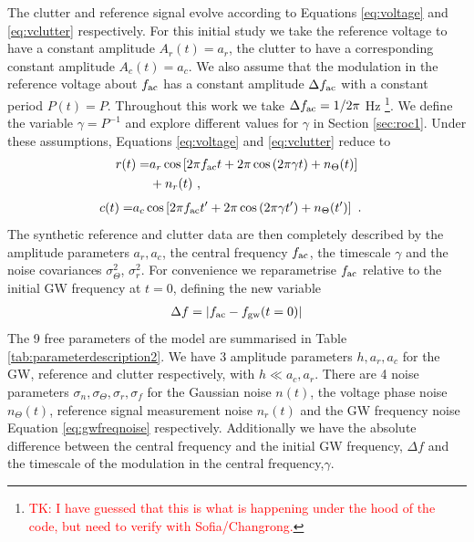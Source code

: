 \documentclass[pra,superscriptaddress,reprint,amsmath,amssymb,nofootinbib]{revtex4-2}
\begin{document}
The clutter and reference signal evolve according to Equations \eqref{eq:voltage} and \eqref{eq:vclutter} respectively. For this initial study we take the reference voltage to have a constant amplitude $A_r(t) = a_r$, the clutter to have a corresponding constant amplitude $A_c(t) = a_c$. We also assume that the modulation in the reference voltage about $f_{\rm ac}$ has a constant amplitude $\Delta f_{\rm ac}$ with a constant period $P(t) = P$. Throughout this work we take $\Delta f_{\rm ac} = 1/2\pi$ Hz \footnote{\tiny \textcolor{red}{TK: I have guessed that this is what is happening under the hood of the code, but need to verify with Sofia/Changrong.}\normalsize}. We define the variable $\gamma = P^{-1}$ and explore different values for $\gamma$ in Section \ref{sec:roc1}. Under these assumptions, Equations \eqref{eq:voltage} and \eqref{eq:vclutter} reduce to 
\begin{align}
	r(t) = &a_r \cos \left[ 2 \pi f_{\rm ac} t + 2 \pi \cos\left(2 \pi \gamma t\right) + n_{\Theta} (t)\right] \\ \nonumber 
	&+n_r(t) \ ,
\end{align}
\begin{eqnarray}
	c(t) = &a_c \cos \left[ 2 \pi f_{\rm ac} t' + 2 \pi \cos\left(2 \pi \gamma t' \right) + n_{\Theta} (t')\right] \ .
\end{eqnarray}
The synthetic reference and clutter data are then completely described by the amplitude parameters $a_r,a_c$, the central frequency $f_{\rm ac}$, the timescale $\gamma$ and the noise covariances $\sigma^2_{\Theta}$, $\sigma_r^2$. For convenience we reparametrise $f_{\rm ac}$ relative to the initial GW frequency at $t=0$, defining the new variable
\begin{eqnarray}
	\Delta f = |f_{\rm ac} - f_{\rm gw}(t=0)|
\end{eqnarray}
The 9 free parameters of the model are summarised in Table \ref{tab:parameterdescription2}. We have 3 amplitude parameters $h, a_r, a_c$ for the GW, reference and clutter respectively, with $h \ll a_c, a_r$. There are 4 noise parameters $\sigma_n, \sigma_{\Theta}, \sigma_r, \sigma_f$ for the Gaussian noise $n(t)$, the voltage phase noise $n_{\Theta}(t)$, reference  signal measurement noise $n_r(t)$ and the GW frequency noise Equation \ref{eq:gwfreqnoise} respectively. Additionally we have the absolute difference between the central frequency and the initial GW frequency, $\Delta f$ and the timescale of the modulation in the central frequency,$\gamma$. \newline 
\end{document}
